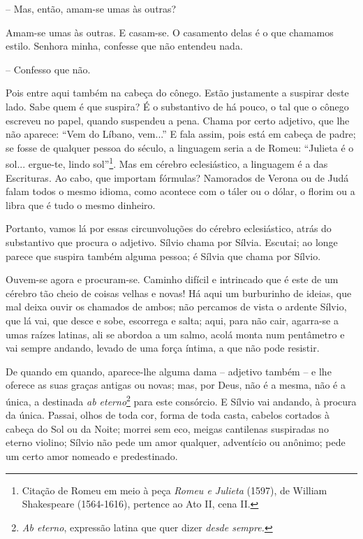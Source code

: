 -- Mas, então, amam-se umas às outras?

Amam-se umas às outras. E casam-se. O casamento delas é o que chamamos
estilo. Senhora minha, confesse que não entendeu nada.

-- Confesso que não.

Pois entre aqui também na cabeça do cônego. Estão justamente a suspirar
deste lado. Sabe quem é que suspira? É o substantivo de há pouco, o tal
que o cônego escreveu no papel, quando suspendeu a pena. Chama por certo
adjetivo, que lhe não aparece: ``Vem do Líbano, vem...'' E fala assim,
pois está em cabeça de padre; se fosse de qualquer pessoa do século, a
linguagem seria a de Romeu: ``Julieta é o sol... ergue-te, lindo
sol''\footnote{Citação de Romeu em meio à peça \emph{Romeu e Julieta}
  (1597), de William Shakespeare (1564-1616), pertence ao Ato II, cena
  II.}. Mas em cérebro eclesiástico, a linguagem é a das Escrituras. Ao
cabo, que importam fórmulas? Namorados de Verona ou de Judá falam todos
o mesmo idioma, como acontece com o táler ou o dólar, o florim ou a
libra que é tudo o mesmo dinheiro.

Portanto, vamos lá por essas circunvoluções do cérebro eclesiástico,
atrás do substantivo que procura o adjetivo. Sílvio chama por Sílvia.
Escutai; ao longe parece que suspira também alguma pessoa; é Sílvia que
chama por Sílvio.

Ouvem-se agora e procuram-se. Caminho difícil e intrincado que é este de
um cérebro tão cheio de coisas velhas e novas! Há aqui um burburinho de
ideias, que mal deixa ouvir os chamados de ambos; não percamos de vista
o ardente Sílvio, que lá vai, que desce e sobe, escorrega e salta; aqui,
para não cair, agarra-se a umas raízes latinas, ali se abordoa a um
salmo, acolá monta num pentâmetro e vai sempre andando, levado de uma
força íntima, a que não pode resistir.

De quando em quando, aparece-lhe alguma dama -- adjetivo também -- e lhe
oferece as suas graças antigas ou novas; mas, por Deus, não é a mesma,
não é a única, a destinada \emph{ab eterno}\footnote{\emph{Ab eterno},
  expressão latina que quer dizer \emph{desde sempre. }} para este
consórcio. E Sílvio vai andando, à procura da única. Passai, olhos de
toda cor, forma de toda casta, cabelos cortados à cabeça do Sol ou da
Noite; morrei sem eco, meigas cantilenas suspiradas no eterno violino;
Sílvio não pede um amor qualquer, adventício ou anônimo; pede um certo
amor nomeado e predestinado.

